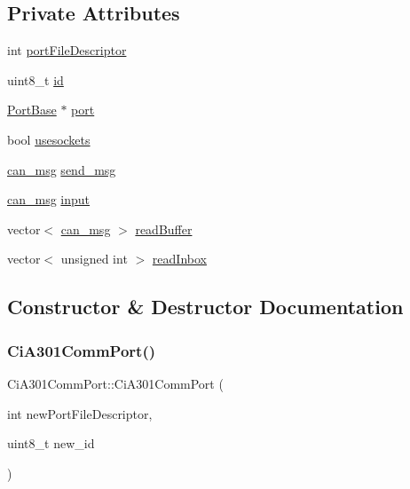 \subsection*{Private Attributes}
\begin{DoxyCompactItemize}
\item 
int \hyperlink{classCiA301CommPort_adc50c8d333b18fcb1b5c61ca69ea05c6}{port\+File\+Descriptor}
\item 
uint8\+\_\+t \hyperlink{classCiA301CommPort_a1ae075d22fc854da21a6e691bb029fc0}{id}
\item 
\hyperlink{classPortBase}{Port\+Base} $\ast$ \hyperlink{classCiA301CommPort_a6b8366387075c99ee980d2ca79c7b7fc}{port}
\item 
bool \hyperlink{classCiA301CommPort_a579e0de814111bde3bbe18cceb76ce64}{usesockets}
\item 
\hyperlink{structcan__msg}{can\+\_\+msg} \hyperlink{classCiA301CommPort_ade81ac897a5d851d946dd7a18245b75d}{send\+\_\+msg}
\item 
\hyperlink{structcan__msg}{can\+\_\+msg} \hyperlink{classCiA301CommPort_ae0f955c7141e2067307cea0b48e111d4}{input}
\item 
vector$<$ \hyperlink{structcan__msg}{can\+\_\+msg} $>$ \hyperlink{classCiA301CommPort_a8b904f3591ecfb99fd82271343727215}{read\+Buffer}
\item 
vector$<$ unsigned int $>$ \hyperlink{classCiA301CommPort_a41b2fcb24a27e5280417db03d8cdb399}{read\+Inbox}
\end{DoxyCompactItemize}


\subsection{Constructor \& Destructor Documentation}
\mbox{\label{classCiA301CommPort_aae705cb5c6a405ef74a10e5220d0b08f}} 
\subsubsection{\texorpdfstring{Ci\+A301\+Comm\+Port()}{CiA301CommPort()}\hspace{0.1cm}{\footnotesize\ttfamily [1/2]}}
{\footnotesize\ttfamily Ci\+A301\+Comm\+Port\+::\+Ci\+A301\+Comm\+Port (\begin{DoxyParamCaption}\item[{int}]{new\+Port\+File\+Descriptor,  }\item[{uint8\+\_\+t}]{new\+\_\+id }\end{DoxyParamCaption})}

